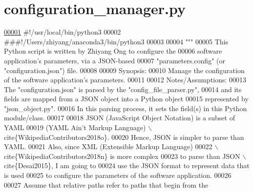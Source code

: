 \hypertarget{configuration__manager_8py_source}{}\section{configuration\+\_\+manager.\+py}
\label{configuration__manager_8py_source}

\begin{DoxyCode}
\hypertarget{configuration__manager_8py_source_l00001}{}\hyperlink{namespaceutilities_1_1configuration__manager}{00001} \textcolor{comment}{#!/usr/local/bin/python3}
00002 \textcolor{comment}{###!/Users/zhiyang/anaconda3/bin/python3}
00003 
00004 \textcolor{stringliteral}{"""}
00005 \textcolor{stringliteral}{    This Python script is written by Zhiyang Ong to configure the}
00006 \textcolor{stringliteral}{        software application's parameters, via a JSON-based}
00007 \textcolor{stringliteral}{        "parameters.config" (or "configuration.json") file.}
00008 \textcolor{stringliteral}{}
00009 \textcolor{stringliteral}{    Synopsis:}
00010 \textcolor{stringliteral}{    Manage the configuration of the software application's parameters.}
00011 \textcolor{stringliteral}{}
00012 \textcolor{stringliteral}{    Notes/Assumptions:}
00013 \textcolor{stringliteral}{    The "configuration.json" is parsed by the "config\_file\_parser.py",}
00014 \textcolor{stringliteral}{        and its fields are mapped from a JSON object into a Python object}
00015 \textcolor{stringliteral}{        represented by "json\_object.py".}
00016 \textcolor{stringliteral}{    In this parsing process, it sets the field(s) in this Python module/class.}
00017 \textcolor{stringliteral}{}
00018 \textcolor{stringliteral}{        JSON (JavaScript Object Notation) is a subset of YAML}
00019 \textcolor{stringliteral}{            (YAML Ain't Markup Language) \(\backslash\)cite\{WikipediaContributors2018o\}.}
00020 \textcolor{stringliteral}{        Hence, JSON is simpler to parse than YAML.}
00021 \textcolor{stringliteral}{        Also, since XML (Extensible Markup Language)}
00022 \textcolor{stringliteral}{            \(\backslash\)cite\{WikipediaContributors2018n\} is more complex}
00023 \textcolor{stringliteral}{            to parse than JSON \(\backslash\)cite\{Desai2015\}, I am going to}
00024 \textcolor{stringliteral}{            use the JSON format to represent data that is used}
00025 \textcolor{stringliteral}{            to configure the parameters of the software application.}
00026 \textcolor{stringliteral}{}
00027 \textcolor{stringliteral}{    Assume that relative paths refer to paths that begin from the}

\end{DoxyCode}
